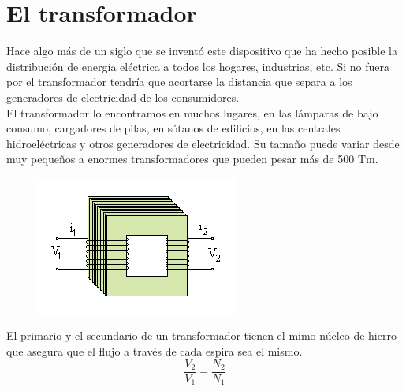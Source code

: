 \documentclass[a4paper,11pt]{report}
\begin{document}
\section{El transformador}
Hace algo más de un siglo que se inventó este dispositivo que ha hecho posible la distribución de energía eléctrica a todos los hogares, industrias, etc. Si no fuera por el transformador tendría que acortarse la distancia que separa a los generadores de electricidad de los consumidores. \\
El transformador lo encontramos en muchos lugares, en las lámparas de bajo consumo, cargadores de pilas, en sótanos de edificios, en las centrales hidroeléctricas y otros generadores de electricidad. Su tamaño puede variar desde muy pequeños a enormes transformadores que pueden pesar más de 500 Tm.
\begin{figure}[H]
\centering
\includegraphics[scale=1.1]{Acoplados2.png}
\end{figure}
El primario y el secundario de un transformador tienen el mimo núcleo de hierro que asegura que el flujo a través de cada espira sea el mismo.
$$
\frac{V_{2}}{V_{1}} = \frac{N_{2}}{N_{1}}
$$
\end{document}
